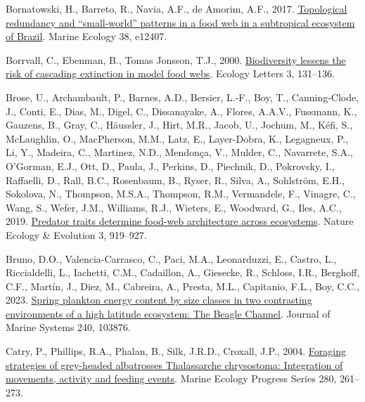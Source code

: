\documentclass[preprint, 3p,
authoryear]{elsarticle} %
\newlength{\cslhangindent}
\newlength{\cslentryspacingunit} %
\newenvironment{CSLReferences}[2] %
 {%
  \setlength{\parindent}{0pt}
  \ifodd #1
  \let\oldpar\par
  \def\par{\hangindent=\cslhangindent\oldpar}
  \fi
  \setlength{\parskip}{#2\cslentryspacingunit}
 }%
 {}
\begin{document}
\begin{CSLReferences}{1}{0}
\leavevmode{}%
Bornatowski, H., Barreto, R., Navia, A.F., de Amorim, A.F., 2017.
\href{https://doi.org/10.1111/maec.12407}{Topological redundancy and
{``small-world''} patterns in a food web in a subtropical ecosystem of
{Brazil}}. Marine Ecology 38, e12407.

\leavevmode{}%
Borrvall, C., Ebenman, B., Tomas Jonsson, T.J., 2000.
\href{https://doi.org/10.1046/j.1461-0248.2000.00130.x}{Biodiversity
lessens the risk of cascading extinction in model food webs}. Ecology
Letters 3, 131--136.

\leavevmode{}%
Brose, U., Archambault, P., Barnes, A.D., Bersier, L.-F., Boy, T.,
Canning-Clode, J., Conti, E., Dias, M., Digel, C., Dissanayake, A.,
Flores, A.A.V., Fussmann, K., Gauzens, B., Gray, C., Häussler, J., Hirt,
M.R., Jacob, U., Jochum, M., Kéfi, S., McLaughlin, O., MacPherson, M.M.,
Latz, E., Layer-Dobra, K., Legagneux, P., Li, Y., Madeira, C., Martinez,
N.D., Mendonça, V., Mulder, C., Navarrete, S.A., O'Gorman, E.J., Ott,
D., Paula, J., Perkins, D., Piechnik, D., Pokrovsky, I., Raffaelli, D.,
Rall, B.C., Rosenbaum, B., Ryser, R., Silva, A., Sohlström, E.H.,
Sokolova, N., Thompson, M.S.A., Thompson, R.M., Vermandele, F., Vinagre,
C., Wang, S., Wefer, J.M., Williams, R.J., Wieters, E., Woodward, G.,
Iles, A.C., 2019.
\href{https://doi.org/10.1038/s41559-019-0899-x}{Predator traits
determine food-web architecture across ecosystems}. Nature Ecology \&
Evolution 3, 919--927.

\leavevmode{}%
Bruno, D.O., Valencia-Carrasco, C., Paci, M.A., Leonarduzzi, E., Castro,
L., Riccialdelli, L., Iachetti, C.M., Cadaillon, A., Giesecke, R.,
Schloss, I.R., Berghoff, C.F., Martín, J., Diez, M., Cabreira, A.,
Presta, M.L., Capitanio, F.L., Boy, C.C., 2023.
\href{https://doi.org/10.1016/j.jmarsys.2023.103876}{Spring plankton
energy content by size classes in two contrasting environments of a high
latitude ecosystem: {The Beagle Channel}}. Journal of Marine Systems
240, 103876.

\leavevmode{}%
Catry, P., Phillips, R.A., Phalan, B., Silk, J.R.D., Croxall, J.P.,
2004. \href{https://doi.org/10.3354/meps280261}{Foraging strategies of
grey-headed albatrosses {Thalassarche} chrysostoma: Integration of
movements, activity and feeding events}. Marine Ecology Progress Series
280, 261--273.


\end{CSLReferences}
\end{document}
